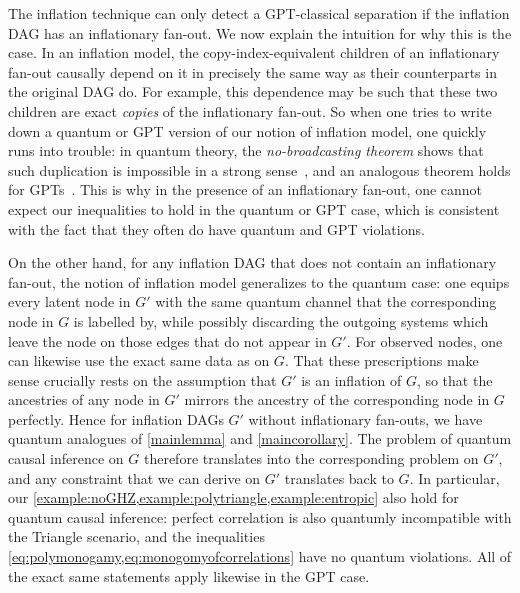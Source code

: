 {  The inflation technique can only detect a GPT-classical separation if the inflation DAG has an inflationary fan-out. 
We now explain the intuition for why this is the case. 
In an inflation model, the copy-index-equivalent children of an inflationary fan-out causally depend on it in precisely the same way as their counterparts in the original DAG do. For example, this dependence may be such that these two children are exact \emph{copies} of the inflationary fan-out. So when one tries to write down a quantum or GPT version of our notion of inflation model, one quickly runs into trouble: in quantum theory, the {\em no-broadcasting theorem} shows that such duplication is impossible in a strong sense~\cite{NoCloningQuantum1996}, and an analogous theorem holds for GPTs~\cite{NoCloningGeneral2006}. This is why in the presence of an inflationary fan-out, one cannot expect our inequalities to hold in the quantum or GPT case, which is consistent with the fact that they often do have quantum and GPT violations.

On the other hand, for any inflation DAG that does not contain an inflationary fan-out, the notion of inflation model generalizes to the quantum case: one equips every latent node in $G'$ with the same quantum channel that the corresponding node in $G$ is labelled by, while possibly discarding the outgoing systems which leave the node on those edges that do not appear in $G'$. For observed nodes, one can likewise use the exact same data as on $G$. That these prescriptions make sense crucially rests on the assumption that $G'$ is an inflation of $G$, so that the ancestries of any node in $G'$ mirrors the ancestry of the corresponding node in $G$ perfectly. Hence for inflation DAGs $G'$ without inflationary fan-outs, we have quantum analogues of \cref{mainlemma} and \cref{maincorollary}. The problem of quantum causal inference on $G$ therefore translates into the corresponding problem on $G'$, and any constraint that we can derive on $G'$ translates back to $G$. In particular, our \cref{example:noGHZ,example:polytriangle,example:entropic} also hold for quantum causal inference: perfect correlation is also quantumly incompatible with the Triangle scenario, and the inequalities \cref{eq:polymonogamy,eq:monogomyofcorrelations} have no quantum violations. All of the exact same statements apply likewise in the GPT case.

}
